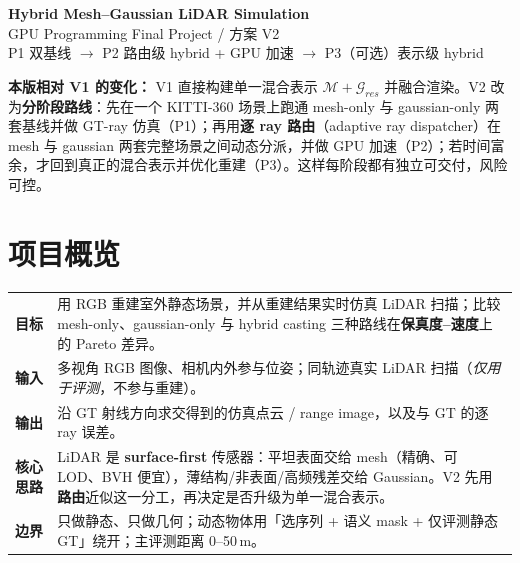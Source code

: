 \documentclass[10pt,a4paper]{article}
\begin{document}
\begin{center}
{\LARGE\bfseries\color{cblue} Hybrid Mesh--Gaussian LiDAR Simulation}\\[3pt]
{\large GPU Programming Final Project \;/\; 方案 V2}\\[2pt]
{\small\color{cgray} P1 双基线 $\rightarrow$ P2 路由级 hybrid + GPU 加速 $\rightarrow$ P3（可选）表示级 hybrid}
\end{center}

\vspace{-4pt}

\begin{tcolorbox}[colback=orange!4,colframe=corange!55,boxrule=0.6pt,arc=2pt,left=4pt,right=4pt,top=2pt,bottom=2pt]
\small\textbf{本版相对 V1 的变化：} V1 直接构建单一混合表示 $\mathcal{M}+\mathcal{G}_{res}$ 并融合渲染。V2 改为\textbf{分阶段路线}：先在一个 KITTI-360 场景上跑通 mesh-only 与 gaussian-only 两套基线并做 GT-ray 仿真（P1）；再用\textbf{逐 ray 路由}（adaptive ray dispatcher）在 mesh 与 gaussian 两套完整场景之间动态分派，并做 GPU 加速（P2）；若时间富余，才回到真正的混合表示并优化重建（P3）。这样每阶段都有独立可交付，风险可控。
\end{tcolorbox}

\section{项目概览}

\begin{tabularx}{\textwidth}{@{}p{2.4cm}Y@{}}
\toprule
\textbf{目标} & 用 RGB 重建室外静态场景，并从重建结果实时仿真 LiDAR 扫描；比较 mesh-only、gaussian-only 与 hybrid casting 三种路线在\textbf{保真度--速度}上的 Pareto 差异。\\
\textbf{输入} & 多视角 RGB 图像、相机内外参与位姿；同轨迹真实 LiDAR 扫描（\emph{仅用于评测}，不参与重建）。\\
\textbf{输出} & 沿 GT 射线方向求交得到的仿真点云 / range image，以及与 GT 的逐 ray 误差。\\
\textbf{核心思路} & LiDAR 是 \textbf{surface-first} 传感器：平坦表面交给 mesh（精确、可 LOD、BVH 便宜），薄结构/非表面/高频残差交给 Gaussian。V2 先用\textbf{路由}近似这一分工，再决定是否升级为单一混合表示。\\
\textbf{边界} & 只做静态、只做几何；动态物体用「选序列 + 语义 mask + 仅评测静态 GT」绕开；主评测距离 0--50\,m。\\
\bottomrule
\end{tabularx}
\end{document}
